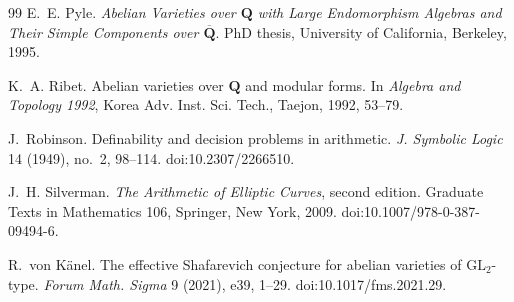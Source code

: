\documentclass[11pt]{article}
\theoremstyle{definition}
\begin{document}
\begin{thebibliography}{99}
E.~E. Pyle.
\newblock \emph{Abelian Varieties over $\mathbf Q$ with Large Endomorphism
  Algebras and Their Simple Components over $\overline{\mathbf Q}$}.
\newblock PhD thesis, University of California, Berkeley, 1995.

K.~A. Ribet.
\newblock Abelian varieties over $\mathbf Q$ and modular forms.
\newblock In \emph{Algebra and Topology 1992}, Korea Adv. Inst. Sci. Tech.,
  Taejon, 1992, 53--79.

J.~Robinson.
\newblock Definability and decision problems in arithmetic.
\newblock \emph{J. Symbolic Logic} 14 (1949), no.~2, 98--114.
\newblock doi:10.2307/2266510.

J.~H. Silverman.
\newblock \emph{The Arithmetic of Elliptic Curves}, second edition.
\newblock Graduate Texts in Mathematics 106, Springer, New York, 2009.
\newblock doi:10.1007/978-0-387-09494-6.

R.~von K\"anel.
\newblock The effective Shafarevich conjecture for abelian varieties of
  $\mathrm{GL}_2$-type.
\newblock \emph{Forum Math. Sigma} 9 (2021), e39, 1--29.
\newblock doi:10.1017/fms.2021.29.

\end{thebibliography}
\end{document}
